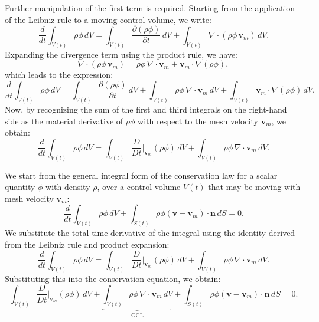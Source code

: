\documentclass[12pt]{extarticle}
\newcommand{\<}{\langle}
\renewcommand{\>}{\rangle}
\theoremstyle{definition}
\begin{document}
Further manipulation of the first term is required. Starting from the application of the Leibniz rule to a moving control volume, we write:
\begin{equation}
\frac{d}{dt} \int_{V(t)} \rho \phi \, dV = \int_{V(t)} \frac{\partial (\rho \phi)}{\partial t} \, dV + \int_{V(t)} \nabla \cdot (\rho \phi \, \textbf{v}_m) \, dV.
\end{equation}
Expanding the divergence term using the product rule, we have:
\[
\nabla \cdot (\rho \phi \, \textbf{v}_m) = \rho \phi \, \nabla \cdot \textbf{v}_m + \textbf{v}_m \cdot \nabla (\rho \phi),
\]
which leads to the expression:
\begin{equation}
\frac{d}{dt} \int_{V(t)} \rho \phi \, dV = \int_{V(t)} \frac{\partial (\rho \phi)}{\partial t} \, dV + \int_{V(t)} \rho \phi \, \nabla \cdot \textbf{v}_m \, dV + \int_{V(t)} \textbf{v}_m \cdot \nabla (\rho \phi) \, dV.
\end{equation}
Now, by recognizing the sum of the first and third integrals on the right-hand side as the material derivative of \(\rho \phi\) with respect to the mesh velocity \(\textbf{v}_m\), we obtain:
\begin{equation}
\frac{d}{dt} \int_{V(t)} \rho \phi \, dV = \int_{V(t)} \frac{D}{Dt}\bigg|_{\textbf{v}_m} (\rho \phi) \, dV + \int_{V(t)} \rho \phi \, \nabla \cdot \textbf{v}_m \, dV.
\end{equation}

We start from the general integral form of the conservation law for a scalar quantity \( \phi \) with density \( \rho \), over a control volume \( V(t) \) that may be moving with mesh velocity \( \textbf{v}_m \):
\begin{equation}
\frac{d}{dt} \int_{V(t)} \rho \phi \, dV + \int_{S(t)} \rho \phi (\textbf{v} - \textbf{v}_m) \cdot \textbf{n} \, dS = 0.
\end{equation}
We substitute the total time derivative of the integral using the identity derived from the Leibniz rule and product expansion:
\begin{equation}
\frac{d}{dt} \int_{V(t)} \rho \phi \, dV = \int_{V(t)} \frac{D}{Dt}\bigg|_{\textbf{v}_m} (\rho \phi) \, dV + \int_{V(t)} \rho \phi \, \nabla \cdot \textbf{v}_m \, dV.
\end{equation}
Substituting this into the conservation equation, we obtain:
\begin{equation}
\int_{V(t)} \frac{D}{Dt}\bigg|_{\textbf{v}_m} (\rho \phi) \, dV + \underbrace{\int_{V(t)} \rho \phi \, \nabla \cdot \textbf{v}_m \, dV}_{\text{GCL}} + \int_{S(t)} \rho \phi (\textbf{v} - \textbf{v}_m) \cdot \textbf{n} \, dS = 0.
\end{equation}
\end{document}
